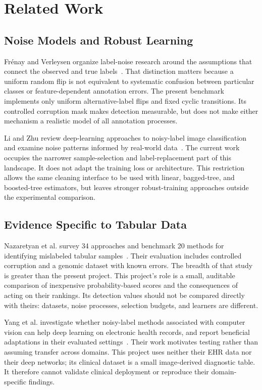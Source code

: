 \chapter{Related Work}
\section{Noise Models and Robust Learning}
Fr\'{e}nay and Verleysen organize label-noise research around the assumptions
that connect the observed and true labels~\cite{frenay2014}. That distinction
matters because a uniform random flip is not equivalent to systematic
confusion between particular classes or feature-dependent annotation errors.
The present benchmark implements only uniform alternative-label flips and
fixed cyclic transitions. Its controlled corruption mask makes detection
measurable, but does not make either mechanism a realistic model of all
annotation processes.

Li and Zhu review deep-learning approaches to noisy-label image
classification and examine noise patterns informed by real-world
data~\cite{li2024}. The current work occupies the narrower
sample-selection and label-replacement part of this landscape. It does not
adapt the training loss or architecture. This restriction allows the same
cleaning interface to be used with linear, bagged-tree, and boosted-tree
estimators, but leaves stronger robust-training approaches outside the
experimental comparison.

\section{Evidence Specific to Tabular Data}
Nazaretyan et al. survey 34 approaches and benchmark 20 methods for identifying
mislabeled tabular samples~\cite{nazaretyan2025}. Their evaluation includes
controlled corruption and a genomic dataset with known errors. The breadth of
that study is greater than the present project. This project's role is a
small, auditable comparison of inexpensive probability-based scores and the
consequences of acting on their rankings. Its detection values should not be
compared directly with theirs: datasets, noise processes, selection budgets,
and learners are different.

Yang et al. investigate whether noisy-label methods associated with computer
vision can help deep learning on electronic health records, and report
beneficial adaptations in their evaluated settings~\cite{yang2024}. Their
work motivates testing rather than assuming transfer across domains. This
project uses neither their EHR data nor their deep networks; its clinical
dataset is a small image-derived diagnostic table. It therefore cannot
validate clinical deployment or reproduce their domain-specific findings.

